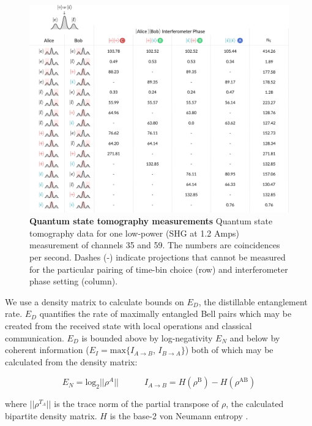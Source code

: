\documentclass[11pt]{caltech_thesis} %
\begin{document}
\hypertarget{fig:counts_chart}{%
\begin{figure}
\centering
\includegraphics[width=1\textwidth,height=\textheight]{./chapter_05/figs/chart_1_light.pdf}
\caption[{Quantum state tomography measurements}]{\textbf{Quantum state tomography measurements} Quantum state tomography data for one low-power (SHG at 1.2 Amps) measurement of channels 35 and 59. The numbers are coincidences per second. Dashes (-) indicate projections that cannot be measured for the particular pairing of time-bin choice (row) and interferometer phase setting (column).}
\label{fig:counts_chart}
\end{figure}
}

We use a density matrix to calculate bounds on $E_D$, the distillable entanglement rate. $E_D$ quantifies the rate of maximally entangled Bell pairs which may be created from the received state with local operations and classical communication. $E_D$ is bounded above by log-negativity $E_N$ and below by coherent information ($E_I = \mathrm{max}\{I_{A\rightarrow B}$, $I_{B\rightarrow A}\}$) \autocite{Alshowkan2022,Eisert2000} both of which may be calculated from the density matrix:

$$E_N = \mathrm{log_2}||\rho^{A}|| \quad\quad\quad I_{A\rightarrow B} = H\left(\rho^\mathrm{B}\right)-H\left(\rho^{\mathrm{AB}}\right)$$

where $||\rho^{T_A}||$ is the trace norm of the partial transpose of $\rho$, the calculated bipartite density matrix. $H$ is the base-2 von Neumann entropy \autocite{Vidal2002negativity,Devetak2004coherent}.
\end{document}
